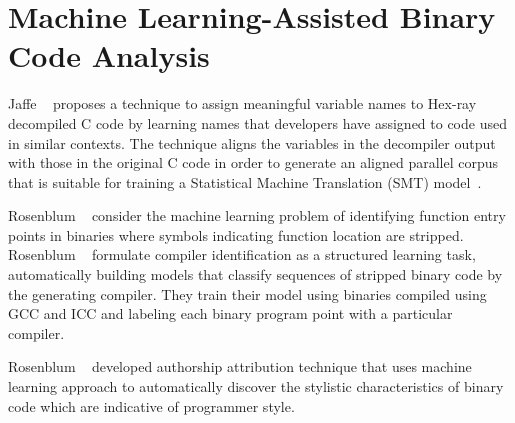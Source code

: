 


\section{Machine Learning-Assisted Binary Code Analysis}\label{sec:ml}

Jaffe \etal~\cite{Jaffe:2018ICPC} proposes a technique to assign meaningful
variable names to Hex-ray~\cite{hexray} decompiled C code by learning names
that developers have assigned to code used in similar contexts. The technique
aligns the variables in the decompiler output with those in the original C code
in order to generate an aligned parallel corpus that is suitable for training a
Statistical Machine Translation (SMT) model~\cite{Koehn:2007}.  

Rosenblum \etal~\cite{Rosenblum2007,Rosenblum:2008,Bao:2014,Shin:2015} consider
the machine learning problem of identifying function entry points in binaries
where symbols indicating function location are stripped.
%
Rosenblum \etal~\cite{Rosenblum:2010} formulate compiler identification as a
structured learning task, automatically building models that classify sequences
of stripped binary code by the generating compiler. They train their model
using binaries compiled using GCC and ICC and labeling each binary program
point with a particular compiler.
%

Rosenblum \etal~\cite{Rosenblum:2011} developed authorship attribution
technique that uses machine learning approach to automatically discover the
stylistic characteristics of binary code which are indicative of programmer
style.





